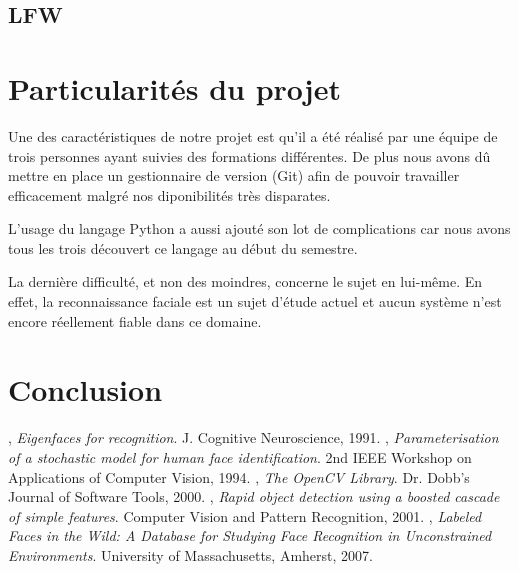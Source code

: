 \documentclass[a4paper,10pt,twocolumn]{extarticle}
\begin{document}
\subsection{LFW}

\section{Particularités du projet}
Une des caractéristiques de notre projet est qu'il a été réalisé par une équipe de trois personnes ayant suivies des formations différentes. De plus nous avons dû mettre en place un gestionnaire de version (Git) afin de pouvoir travailler efficacement malgré nos diponibilités très disparates.

L'usage du langage Python a aussi ajouté son lot de complications car nous avons tous les trois découvert ce langage au début du semestre.

La dernière difficulté, et non des moindres, concerne le sujet en lui-même. En effet, la reconnaissance faciale est un sujet d'étude actuel et aucun système n'est encore réellement fiable dans ce domaine.

\section{Conclusion}


\begin{thebibliography}{9}
  , 
  \emph{Eigenfaces for recognition}.
  J. Cognitive Neuroscience,
  1991. 
  , 
  \emph{Parameterisation of a stochastic model for human face identification}.
  2nd IEEE Workshop on Applications of Computer Vision,
  1994.
  , 
  \emph{The OpenCV Library}.
  Dr. Dobb's Journal of Software Tools,
  2000.
  , 
  \emph{Rapid object detection using a boosted cascade of simple features}.
  Computer Vision and Pattern Recognition,
  2001.
  , 
  \emph{Labeled Faces in the Wild: A Database for Studying Face Recognition in Unconstrained Environments}.
  University of Massachusetts, Amherst,
  2007.

\end{thebibliography}
\end{document}
